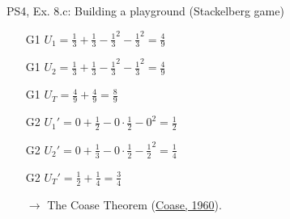 \begin{frame}{PS4, Ex. 8.c: Building a playground (Stackelberg game)}
\begin{multicols}{2}
\begin{itemize}
      \item[G1] \begin{math}U_1=\frac{1}{3}+\frac{1}{3}-\frac{1}{3}^2-\frac{1}{3}^2=\frac{4}{9}\end{math}
      \item[G1] \begin{math}U_2=\frac{1}{3}+\frac{1}{3}-\frac{1}{3}^2-\frac{1}{3}^2=\frac{4}{9}\end{math}
      \item[G1] \begin{math}U_T=\frac{4}{9}+\frac{4}{9}=\frac{8}{9}\end{math}
      \item[G2] \begin{math}U_1'=0+\frac{1}{2}-0\cdot\frac{1}{2}-0^2=\frac{1}{2}\end{math}
      \item[G2] \begin{math}U_2'=0+\frac{1}{3}-0\cdot\frac{1}{2}-\frac{1}{2}^2=\frac{1}{4}\end{math}
      \item[G2] \begin{math}U_T'=\frac{1}{2}+\frac{1}{4}=\frac{3}{4}\end{math}
      \item[$\rightarrow$] The Coase Theorem (\href{https://en.wikipedia.org/wiki/Coase_theorem}{Coase, 1960}).
    \end{itemize}
    \vfill\null
  \end{multicols}
\end{frame}


%


